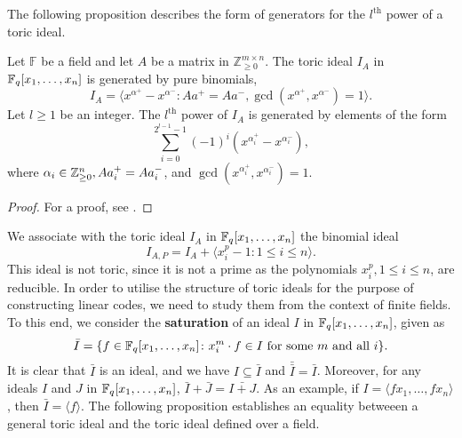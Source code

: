 \documentclass[english,bachelor]{liumaiex}
\begin{document}
The following proposition describes the form of generators for the $l^\textrm{th}$ power of a toric ideal.

\begin{prop}
Let $\mathbb{F}$ be a field and let $A$ be a matrix in $\mathbb{Z}_{\geq0}^{m\times n}$. The toric ideal $I_A$ in $\mathbb{F}_q[x_1,\dots,x_n]$ is generated by pure binomials,
\begin{displaymath}
I_A=\langle x^{\alpha^+}-x^{\alpha^-}\colon Aa^+=Aa^-, \gcd(x^{\alpha^+},x^{\alpha^-})=1\rangle.
\end{displaymath}
Let $l\geq1$ be an integer. The $l^{\textrm{th}}$ power of $I_A$ is generated by elements of the form
\begin{displaymath}
\sum_{i=0}^{2^{l-1}-1}(-1)^i(x^{\alpha_i^+}-x^{\alpha_i^-}),
\end{displaymath}
where $\alpha_i\in\mathbb{Z}_{\geq 0}^n, Aa_i^+=Aa_i^-$, and $\gcd(x^{\alpha_i^+},x^{\alpha_i^-})=1$.
\end{prop}
\begin{proof}
For a proof, see \cite[pp. 52-53]{phd}.
\end{proof}
We associate with the toric ideal $I_A$ in $\mathbb{F}_q[x_1,\dots,x_n]$ the binomial ideal
\begin{displaymath}
I_{A,P}=I_A+\langle x_i^p-1\colon 1\leq i\leq n\rangle.
\end{displaymath}
This ideal is not toric, since it is not a prime as the polynomials $x_i^p, 1\leq i\leq n$, are reducible. In order to utilise the structure of toric ideals for the purpose of constructing linear codes, we need to study them from the context of finite fields. To this end, we consider the \textbf{saturation} of an ideal $I$ in $\mathbb{F}_q[x_1,\dots,x_n]$, given as
\begin{displaymath}
\bar{I}=\{f\in\mathbb{F}_q[x_1,\dots,x_n]\colon x_i^m\cdot f\in I \textrm{ for some } m \textrm{ and all }i\}.
\end{displaymath}
It is clear that $\bar{I}$ is an ideal, and we have $I\subseteq\bar{I}$ and $\bar{\bar{I}}=\bar{I}$. Moreover, for any ideals $I$ and $J$ in $\mathbb{F}_q[x_1,\dots,x_n]$, $\bar{I}+\bar{J}=\bar{I+J}$. As an example, if $I=\langle fx_1,\dots,fx_n\rangle$, then $\bar{I}=\langle f\rangle$. The following proposition establishes an equality betweeen a general toric ideal and the toric ideal defined over a field.
\end{document}
